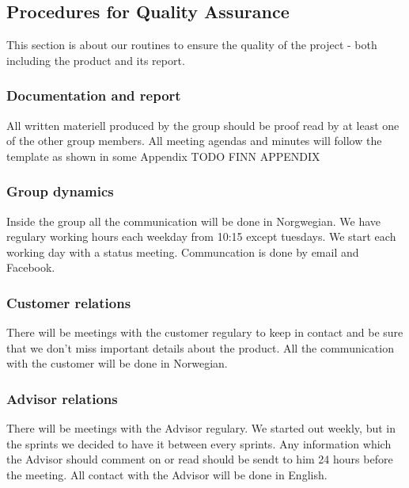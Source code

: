 \subsection{Procedures for Quality Assurance}
This section is about our routines to ensure the quality of the project - both including the product and its report. 

\subsubsection{Documentation and report}
All written materiell produced by the group should be proof read by at least one of the other group members. All meeting agendas and minutes will follow the template as shown in some Appendix TODO FINN APPENDIX

\subsubsection{Group dynamics}
Inside the group all the communication will be done in Norgwegian. We have regulary working hours each weekday from 10:15 except tuesdays. We start each working day with a status meeting. 
Communcation is done by email and Facebook. 

\subsubsection{Customer relations}
There will be meetings with the customer regulary to keep in contact and be sure that we don't miss important details about the product. All the communication with the customer will be done in Norwegian. 


\subsubsection{Advisor relations}
There will be meetings with the Advisor regulary. We started out weekly, but in the sprints we decided to have it between every sprints. Any information which the Advisor should comment on or read should be sendt to him 24 hours before the meeting. All contact with the Advisor will be done in English. 